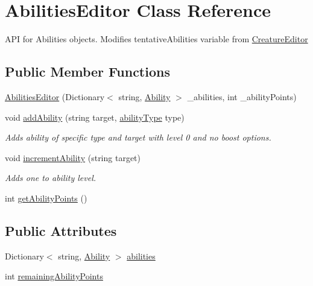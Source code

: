 \hypertarget{class_abilities_editor}{}\section{Abilities\+Editor Class Reference}
\label{class_abilities_editor}


A\+PI for Abilities objects. Modifies tentative\+Abilities variable from \mbox{\hyperlink{class_creature_editor}{Creature\+Editor}}  


\subsection*{Public Member Functions}
\begin{DoxyCompactItemize}
\item 
\mbox{\hyperlink{class_abilities_editor_aaeefe3c664fe012a1649e9d336191766}{Abilities\+Editor}} (Dictionary$<$ string, \mbox{\hyperlink{class_ability}{Ability}} $>$ \+\_\+abilities, int \+\_\+ability\+Points)
\item 
void \mbox{\hyperlink{class_abilities_editor_aa85324dcb2b8c30fa6c31c17fa4e5020}{add\+Ability}} (string target, \mbox{\hyperlink{_abilities_editor_8cs_ae01c380f385ee9eeb03333f20711ab5a}{ability\+Type}} type)
\begin{DoxyCompactList}\small\item\em Adds ability of specific type and target with level 0 and no boost options. \end{DoxyCompactList}\item 
void \mbox{\hyperlink{class_abilities_editor_ac86ded40f4c4184a8761bef47c24c3b1}{increment\+Ability}} (string target)
\begin{DoxyCompactList}\small\item\em Adds one to ability level. \end{DoxyCompactList}\item 
int \mbox{\hyperlink{class_abilities_editor_a8e906d21f62b192257d3ea08a1cc0615}{get\+Ability\+Points}} ()
\end{DoxyCompactItemize}
\subsection*{Public Attributes}
\begin{DoxyCompactItemize}
\item 
Dictionary$<$ string, \mbox{\hyperlink{class_ability}{Ability}} $>$ \mbox{\hyperlink{class_abilities_editor_a27af464d09981394e9dd4f413704c623}{abilities}}
\item 
int \mbox{\hyperlink{class_abilities_editor_ae5617857224baec0dd3a14e218fe25f7}{remaining\+Ability\+Points}}
\end{DoxyCompactItemize}


